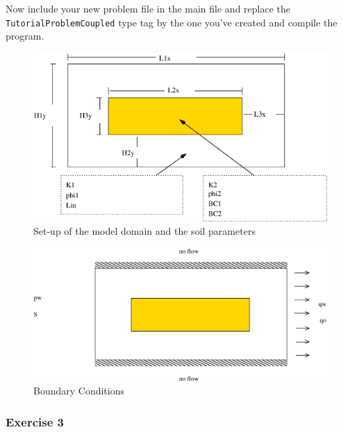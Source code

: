 Now include your new problem file in the main file and replace the
\texttt{TutorialProblemCoupled} type tag by the one you've created and
compile the program.


\begin{figure}[h]
\centering
\includegraphics[width=0.8\linewidth,keepaspectratio]{EPS/Ex2_Domain.eps}
\caption{Set-up of the model domain and the soil parameters}\label{tutorial-coupled:ex2_Domain}
\end{figure}

\begin{figure}[h]
\centering
\includegraphics[width=0.8\linewidth,keepaspectratio]{EPS/Ex2_Boundary.eps}
\caption{Boundary Conditions}\label{tutorial-coupled:ex2_BC}
\end{figure}

\subsubsection{Exercise 3}

